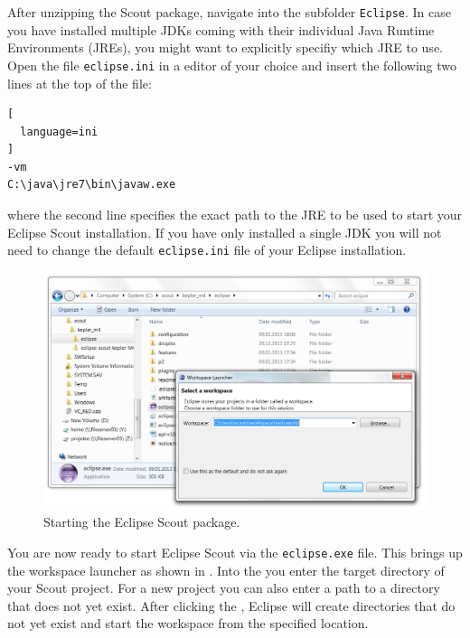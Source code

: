 \documentclass[a4paper,10pt,twoside]{book}
\begin{document}
After unzipping the Scout package, navigate into the subfolder \texttt{Eclipse}.
In case you have installed multiple JDKs coming with their individual Java Runtime Environments (JREs), you might want to explicitly specifiy which JRE to use.
Open the file \texttt{eclipse.ini} in a editor of your choice and insert the following two lines at the top of the file:

\begin{lstlisting}[
  language=ini
]
-vm
C:\java\jre7\bin\javaw.exe
\end{lstlisting}

where the second line specifies the exact path to the JRE to be used to start your Eclipse Scout installation.
If you have only installed a single JDK you will not need to change the default \texttt{eclipse.ini} file of your Eclipse installation.

\begin{figure}
\includegraphics[width=15cm]{scout_startup_select_workspace.png}
\caption{Starting the Eclipse Scout package.}
\end{figure}

You are now ready to start Eclipse Scout via the \texttt{eclipse.exe} file. 
This brings up the workspace launcher as shown in .
Into the  you enter the target directory of your Scout project.
For a new project you can also enter a path to a directory that does not yet exist.
After clicking the , Eclipse will create directories that do not yet exist and start the workspace from the specified location.
\end{document}
